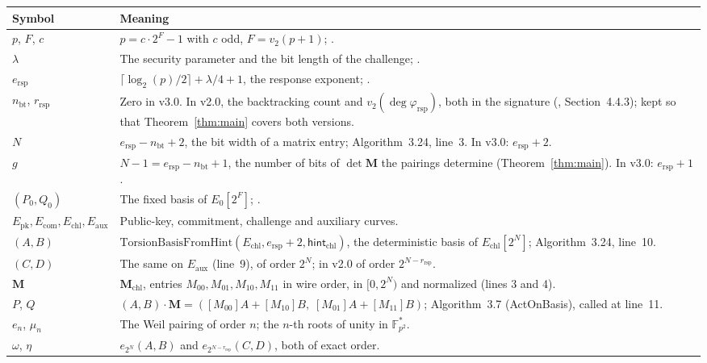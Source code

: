 \documentclass[version=submission]{iacrcc}
\newcommand{\Fpq}{\mathbb{F}_{p^2}}
\newcommand{\ers}{e_{\mathrm{rsp}}}
\newcommand{\nbt}{n_{\mathrm{bt}}}
\newcommand{\rrs}{r_{\mathrm{rsp}}}
\newcommand{\Mm}{\mathbf{M}}
\newcommand{\Echl}{E_{\mathrm{chl}}}
\newcommand{\Eaux}{E_{\mathrm{aux}}}
\newcommand{\Ecom}{E_{\mathrm{com}}}
\newcommand{\Epk}{E_{\mathrm{pk}}}
\begin{document}
\begin{center}
\small
\begin{tabular}{l p{9.7cm}}
\toprule
\textbf{Symbol} & \textbf{Meaning} \\
\midrule
$p$, $F$, $c$ & $p = c \cdot 2^F - 1$ with $c$ odd, $F = v_2(p + 1)$; \cite[Section~5.2]{sqisign-spec-r3}. \\
$\lambda$ & The security parameter and the bit length of the challenge; \cite[Table~5]{sqisign-spec-r3}. \\
$\ers$ & $\lceil \log_2 (p) / 2 \rceil + \lambda / 4 + 1$, the response exponent; \cite[Table~5]{sqisign-spec-r3}. \\
$\nbt$, $\rrs$ & Zero in v3.0. In v2.0, the backtracking count and $v_2(\deg \varphi_{\mathrm{rsp}})$, both in the signature (\cite{sqisign-spec-r2}, Section~4.4.3); kept so that Theorem~\ref{thm:main} covers both versions. \\
$N$ & $\ers - \nbt + 2$, the bit width of a matrix entry; Algorithm~3.24, line~3. In v3.0: $\ers + 2$. \\
$g$ & $N - 1 = \ers - \nbt + 1$, the number of bits of $\det \Mm$ the pairings determine (Theorem~\ref{thm:main}). In v3.0: $\ers + 1$. \\
$(P_0, Q_0)$ & The fixed basis of $E_0[2^F]$; \cite[Section~3.2]{sqisign-spec-r3}. \\
$\Epk, \Ecom, \Echl, \Eaux$ & Public-key, commitment, challenge and auxiliary curves. \\
$(A, B)$ & $\mathrm{TorsionBasisFromHint}(\Echl, \ers + 2, \mathsf{hint}_{\mathrm{chl}})$, the deterministic basis of $\Echl[2^N]$; Algorithm~3.24, line~10. \\
$(C, D)$ & The same on $\Eaux$ (line~9), of order $2^N$; in v2.0 of order $2^{N - \rrs}$. \\
$\Mm$ & $\Mm_{\mathrm{chl}}$, entries $M_{00}, M_{01}, M_{10}, M_{11}$ in wire order, in $[0, 2^N)$ and normalized (lines 3 and 4). \\
$P$, $Q$ & $(A, B) \cdot \Mm = ([M_{00}] A + [M_{10}] B,\; [M_{01}] A + [M_{11}] B)$; Algorithm~3.7 (ActOnBasis), called at line~11. \\
$e_n$, $\mu_n$ & The Weil pairing of order $n$; the $n$-th roots of unity in $\Fpq^*$. \\
$\omega$, $\eta$ & $e_{2^N}(A, B)$ and $e_{2^{N - \rrs}}(C, D)$, both of exact order. \\
\bottomrule
\end{tabular}
\end{center}
\end{document}
